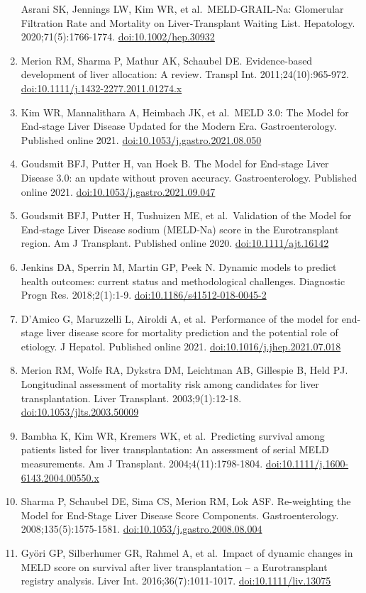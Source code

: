 \documentclass[11pt,english,]{book} %
\begin{document}
\begin{enumerate}
  Asrani SK, Jennings LW, Kim WR, et al.~MELD-GRAIL-Na: Glomerular Filtration Rate and Mortality on Liver-Transplant Waiting List. Hepatology. 2020;71(5):1766-1774. \url{doi:10.1002/hep.30932}
\item
  Merion RM, Sharma P, Mathur AK, Schaubel DE. Evidence-based development of liver allocation: A review. Transpl Int. 2011;24(10):965-972. \url{doi:10.1111/j.1432-2277.2011.01274.x}
\item
  Kim WR, Mannalithara A, Heimbach JK, et al.~MELD 3.0: The Model for End-stage Liver Disease Updated for the Modern Era. Gastroenterology. Published online 2021. \url{doi:10.1053/j.gastro.2021.08.050}
\item
  Goudsmit BFJ, Putter H, van Hoek B. The Model for End-stage Liver Disease 3.0: an update without proven accuracy. Gastroenterology. Published online 2021. \url{doi:10.1053/j.gastro.2021.09.047}
\item
  Goudsmit BFJ, Putter H, Tushuizen ME, et al.~Validation of the Model for End‐stage Liver Disease sodium (MELD‐Na) score in the Eurotransplant region. Am J Transplant. Published online 2020. \url{doi:10.1111/ajt.16142}
\item
  Jenkins DA, Sperrin M, Martin GP, Peek N. Dynamic models to predict health outcomes: current status and methodological challenges. Diagnostic Progn Res. 2018;2(1):1-9. \url{doi:10.1186/s41512-018-0045-2}
\item
  D'Amico G, Maruzzelli L, Airoldi A, et al.~Performance of the model for end-stage liver disease score for mortality prediction and the potential role of etiology. J Hepatol. Published online 2021. \url{doi:10.1016/j.jhep.2021.07.018}
\item
  Merion RM, Wolfe RA, Dykstra DM, Leichtman AB, Gillespie B, Held PJ. Longitudinal assessment of mortality risk among candidates for liver transplantation. Liver Transplant. 2003;9(1):12-18. \url{doi:10.1053/jlts.2003.50009}
\item
  Bambha K, Kim WR, Kremers WK, et al.~Predicting survival among patients listed for liver transplantation: An assessment of serial MELD measurements. Am J Transplant. 2004;4(11):1798-1804. \url{doi:10.1111/j.1600-6143.2004.00550.x}
\item
  Sharma P, Schaubel DE, Sima CS, Merion RM, Lok ASF. Re-weighting the Model for End-Stage Liver Disease Score Components. Gastroenterology. 2008;135(5):1575-1581. \url{doi:10.1053/j.gastro.2008.08.004}
\item
  Györi GP, Silberhumer GR, Rahmel A, et al.~Impact of dynamic changes in MELD score on survival after liver transplantation -- a Eurotransplant registry analysis. Liver Int. 2016;36(7):1011-1017. \url{doi:10.1111/liv.13075}

\end{enumerate}
\end{document}
